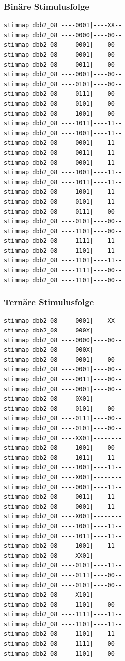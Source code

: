 \documentclass[fleqn]{article}
\begin{document}
\subsubsection{Binäre Stimulusfolge}
\begin{lstlisting}
stimmap dbb2_08 ----0001|----XX--
stimmap dbb2_08 ----0000|----00--
stimmap dbb2_08 ----0001|----00--
stimmap dbb2_08 ----0001|----00--
stimmap dbb2_08 ----0011|----00--
stimmap dbb2_08 ----0001|----00--
stimmap dbb2_08 ----0101|----00--
stimmap dbb2_08 ----0111|----00--
stimmap dbb2_08 ----0101|----00--
stimmap dbb2_08 ----1001|----00--
stimmap dbb2_08 ----1011|----11--
stimmap dbb2_08 ----1001|----11--
stimmap dbb2_08 ----0001|----11--
stimmap dbb2_08 ----0011|----11--
stimmap dbb2_08 ----0001|----11--
stimmap dbb2_08 ----1001|----11--
stimmap dbb2_08 ----1011|----11--
stimmap dbb2_08 ----1001|----11--
stimmap dbb2_08 ----0101|----11--
stimmap dbb2_08 ----0111|----00--
stimmap dbb2_08 ----0101|----00--
stimmap dbb2_08 ----1101|----00--
stimmap dbb2_08 ----1111|----11--
stimmap dbb2_08 ----1101|----11--
stimmap dbb2_08 ----1101|----11--
stimmap dbb2_08 ----1111|----00--
stimmap dbb2_08 ----1101|----00--
\end{lstlisting}

\subsubsection{Ternäre Stimulusfolge}
\begin{lstlisting}
stimmap dbb2_08 ----0001|----XX--
stimmap dbb2_08 ----000X|--------
stimmap dbb2_08 ----0000|----00--
stimmap dbb2_08 ----000X|--------
stimmap dbb2_08 ----0001|----00--
stimmap dbb2_08 ----0001|----00--
stimmap dbb2_08 ----0011|----00--
stimmap dbb2_08 ----0001|----00--
stimmap dbb2_08 ----0X01|--------
stimmap dbb2_08 ----0101|----00--
stimmap dbb2_08 ----0111|----00--
stimmap dbb2_08 ----0101|----00--
stimmap dbb2_08 ----XX01|--------
stimmap dbb2_08 ----1001|----00--
stimmap dbb2_08 ----1011|----11--
stimmap dbb2_08 ----1001|----11--
stimmap dbb2_08 ----X001|--------
stimmap dbb2_08 ----0001|----11--
stimmap dbb2_08 ----0011|----11--
stimmap dbb2_08 ----0001|----11--
stimmap dbb2_08 ----X001|--------
stimmap dbb2_08 ----1001|----11--
stimmap dbb2_08 ----1011|----11--
stimmap dbb2_08 ----1001|----11--
stimmap dbb2_08 ----XX01|--------
stimmap dbb2_08 ----0101|----11--
stimmap dbb2_08 ----0111|----00--
stimmap dbb2_08 ----0101|----00--
stimmap dbb2_08 ----X101|--------
stimmap dbb2_08 ----1101|----00--
stimmap dbb2_08 ----1111|----11--
stimmap dbb2_08 ----1101|----11--
stimmap dbb2_08 ----1101|----11--
stimmap dbb2_08 ----1111|----00--
stimmap dbb2_08 ----1101|----00--
\end{lstlisting}
\end{document}
